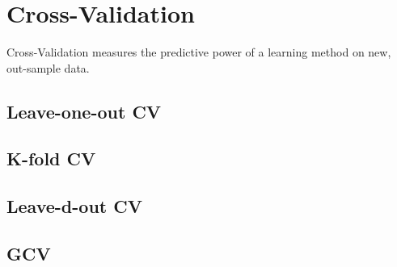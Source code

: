 \section{Cross-Validation}
Cross-Validation measures the predictive power of a learning method on new, out-sample data.
\subsection{Leave-one-out CV}
\begin{theory}
 
\end{theory}
\subsection{K-fold CV}
\subsection{Leave-d-out CV}
\subsection{GCV}